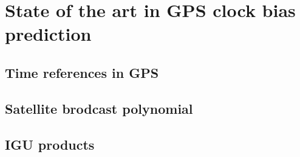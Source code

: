 \section{State of the art in GPS clock bias prediction}

\subsection{Time references in GPS}

\subsection{Satellite brodcast polynomial}

\subsection{IGU products}
